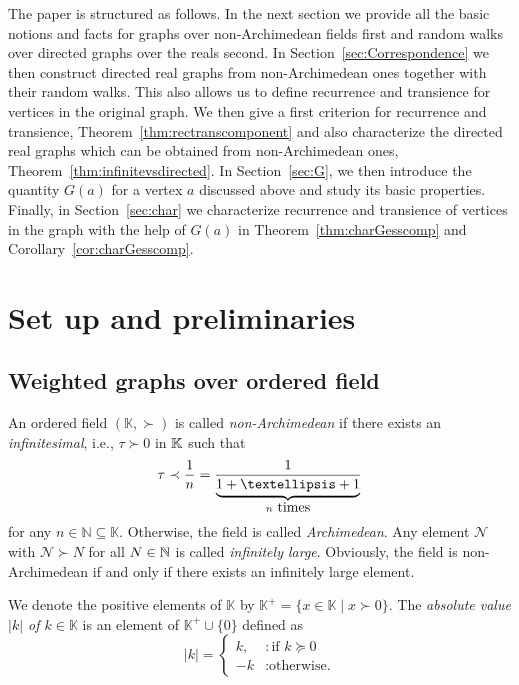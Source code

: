 \documentclass[a4paper,oneside, 12pt]{amsart}
\numberwithin{theorem}{section}
\theoremstyle{definition}
\newcommand{\G}{{G}}
\newcommand{\K}{\mathbb{K}}
\begin{document}
{The paper is structured as follows. In the next section we provide all the basic notions and facts for graphs over non-Archimedean fields first and random walks over directed graphs over the reals second. In Section~\ref{sec:Correspondence} we then construct directed real graphs from non-Archimedean ones together with their random walks. This also allows us to define recurrence and transience for vertices in the original graph.  We then give a first criterion for recurrence and transience, Theorem~\ref{thm:rectranscomponent} and also characterize the directed real graphs which can be obtained from non-Archimedean ones, Theorem~\ref{thm:infinitevsdirected}. In Section~\ref{sec:G}, we then introduce the quantity $ \G(a) $ for a vertex $ a $ discussed above and study its basic properties. Finally, in Section~\ref{sec:char} we characterize recurrence and transience of vertices in the graph with the help of $ \G(a) $ in Theorem~\ref{thm:charGesscomp} and Corollary~\ref{cor:charGesscomp}.

\section{Set up and preliminaries}
\subsection{Weighted graphs over ordered field}
An ordered field $(\K, \succ)$ is called {\em non-Archimedean} if there exists an {\em infinitesimal}, i.e., $\tau \succ 0$  in  $\Bbb K$ such that 
$$
{\tau}\prec \dfrac{1}{n}=\dfrac{1}{\underbrace{1+\dots+1}_{n\mbox{ \tiny{times}}}}
$$
for any $n\in \mathbb N\subseteq\K$. Otherwise, the field is called {\em Archimedean}. Any element $\mathcal N$ with $\mathcal N\succ N$ for all $N\in \Bbb N$ is called {\em infinitely large}. Obviously, the field is non-Archimedean if and only if there exists an infinitely large element. 



We denote the positive elements of $ \K $ by $ \K^+=\{x\in \K\mid x\succ 0\} $. The \emph{absolute value $|k|$  of $k\in \K$} is an element of  $ \K^+\cup\{0\} $ defined as 
\begin{equation*}
|k|=\begin{cases}
k,&:\mbox{if }k\succeq 0\\
-k&: \mbox{otherwise.}
\end{cases}
\end{equation*}

}
\end{document}
